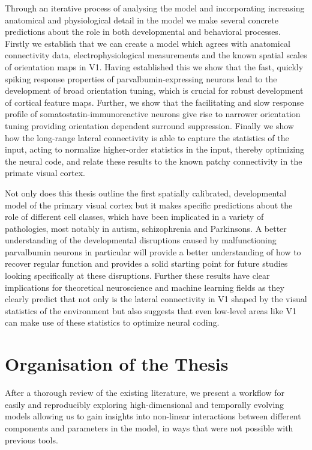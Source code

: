 Through an iterative process of analysing the model and incorporating
increasing anatomical and physiological detail in the model we make
several concrete predictions about the role in both developmental and
behavioral processes. Firstly we establish that we can create a model
which agrees with anatomical connectivity data, electrophysiological
measurements and the known spatial scales of orientation maps in V1.
Having established this we show that the fast, quickly spiking
response properties of parvalbumin-expressing neurons lead to the
development of broad orientation tuning, which is crucial for robust
development of cortical feature maps. Further, we show that the
facilitating and slow response profile of somatostatin-immunoreactive
neurons give rise to narrower orientation tuning providing orientation
dependent surround suppression. Finally we show how the long-range
lateral connectivity is able to capture the statistics of the input,
acting to normalize higher-order statistics in the input, thereby
optimizing the neural code, and relate these results to the known
patchy connectivity in the primate visual cortex.

Not only does this thesis outline the first spatially calibrated,
developmental model of the primary visual cortex but it makes specific
predictions about the role of different cell classes, which have been
implicated in a variety of pathologies, most notably in autism,
schizophrenia and Parkinsons. A better understanding of the
developmental disruptions caused by malfunctioning parvalbumin neurons
in particular will provide a better understanding of how to recover
regular function and provides a solid starting point for future
studies looking specifically at these disruptions. Further these
results have clear implications for theoretical neuroscience and
machine learning fields as they clearly predict that not only is the
lateral connectivity in V1 shaped by the visual statistics of the
environment but also suggests that even low-level areas like V1 can
make use of these statistics to optimize neural coding.

\section{Organisation of the Thesis}

After a thorough review of the existing literature, we present a
workflow for easily and reproducibly exploring high-dimensional and
temporally evolving models allowing us to gain insights into
non-linear interactions between different components and parameters in
the model, in ways that were not possible with previous tools.

